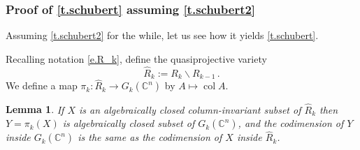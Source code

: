 \documentclass[10pt, a4paper]{amsart}
\theoremstyle{plain}
\newtheorem{lemma}{Lemma}[section]
\theoremstyle{definition}
\theoremstyle{remark}
\theoremstyle{note}
\numberwithin{equation}{section}
\begin{document}
\subsubsection{Proof of \cref{t.schubert} assuming \cref{t.schubert2}} \label{sss.reduction}

Assuming \cref{t.schubert2} for the while, let us see how it yields \cref{t.schubert}.

Recalling notation \eqref{e.R_k}, define the quasiprojective variety
$$
\hat{R}_k := R_k {\smallsetminus} R_{k-1} \, .
$$
We define a map $\pi_k \colon \hat{R}_k \to G_k({\mathbb{C}}^n)$
by $A \mapsto \operatorname{col} A$.

\begin{lemma}\label{l.projection}
If $X$ is an algebraically closed column-invariant subset of $\hat{R}_k$
then $Y = \pi_k(X)$ is algebraically closed subset of $G_k({\mathbb{C}}^n)$,
and the codimension of $Y$ inside $G_k({\mathbb{C}}^n)$ is the same as the codimension of $X$ inside $\hat{R}_k$.
\end{lemma}
\end{document}
